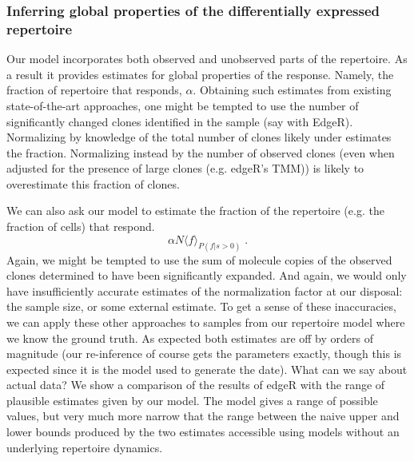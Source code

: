 \documentclass[letterpaper,english,prl,reprint,longbibliography]{revtex4-1} %
\begin{document}
\subsubsection*{Inferring global properties of the differentially expressed repertoire}
Our model incorporates both observed and unobserved parts of the repertoire. As a result it provides estimates for global properties of the response. Namely, the fraction of repertoire that responds, $\alpha$. Obtaining such estimates from existing state-of-the-art approaches, one might be tempted to use the number of significantly changed clones identified in the sample (say with EdgeR). Normalizing by knowledge of the total number of clones likely under estimates the fraction. Normalizing instead by the number of observed clones (even when adjusted for the presence of large clones (e.g. edgeR's TMM)) is likely to overestimate this fraction of clones.

We can also ask our model to estimate the fraction of the repertoire (e.g. the fraction of cells) that respond. 
\begin{equation}
	\alpha N \langle f\rangle_{P(f|s>0)}\;.
\end{equation}
Again, we might be tempted to use the sum of molecule copies of the observed clones determined to have been significantly expanded. And again, we would only have insufficiently accurate estimates of the normalization factor at our disposal: the sample size, or some external estimate.
To get a sense of these inaccuracies, we can apply these other approaches to samples from our repertoire model where we know the ground truth. As expected both estimates are off by orders of magnitude (our re-inference of course gets the parameters exactly, though this is expected since it is the model used to generate the date).
What can we say about actual data? We show a comparison of the results of edgeR with the range of plausible estimates given by our model. The model gives a range of possible values, but very much more narrow that the range between the naive upper and lower bounds produced by the two estimates accessible using models without an underlying repertoire dynamics.
\end{document}
